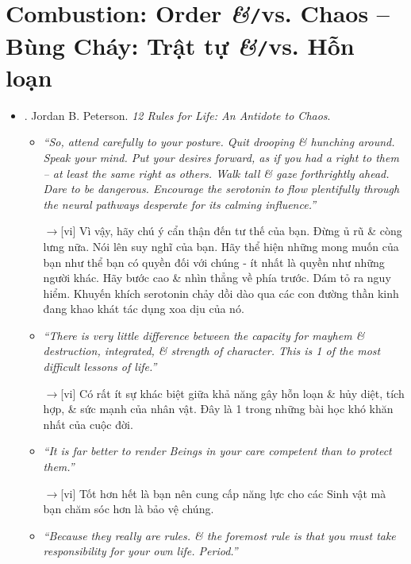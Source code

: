 \documentclass[12pt,oneside]{book}
\begin{document}
\chapter{Combustion: Order {\it\&}{\tt/}vs. Chaos -- Bùng Cháy: Trật tự {\it\&}{\tt/}vs. Hỗn loạn}
\minitoc
{}
\begin{itemize}
	\item \cite{Peterson_rule}. {\sc Jordan B. Peterson}. {\it 12 Rules for Life: An Antidote to Chaos}.
	\begin{itemize}
		\item {\it``So, attend carefully to your posture. Quit drooping \& hunching around. Speak your mind. Put your desires forward, as if you had a right to them -- at least the same right as others. Walk tall \& gaze forthrightly ahead. Dare to be dangerous. Encourage the serotonin to flow plentifully through the neural pathways desperate for its calming influence.''}
		
		{\sf[en]$\to$[vi]} Vì vậy, hãy chú ý cẩn thận đến tư thế của bạn. Đừng ủ rũ \& còng lưng nữa. Nói lên suy nghĩ của bạn. Hãy thể hiện những mong muốn của bạn như thể bạn có quyền đối với chúng - ít nhất là quyền như những người khác. Hãy bước cao \& nhìn thẳng về phía trước. Dám tỏ ra nguy hiểm. Khuyến khích serotonin chảy dồi dào qua các con đường thần kinh đang khao khát tác dụng xoa dịu của nó.
		
		\item {\it``There is very little difference between the capacity for mayhem \& destruction, integrated, \& strength of character. This is 1 of the most difficult lessons of life.''}
		
		{\sf[en]$\to$[vi]} Có rất ít sự khác biệt giữa khả năng gây hỗn loạn \& hủy diệt, tích hợp, \& sức mạnh của nhân vật. Đây là 1 trong những bài học khó khăn nhất của cuộc đời.
		
		\item {\it``It is far better to render Beings in your care competent than to protect them.''}
		
		{\sf[en]$\to$[vi]} Tốt hơn hết là bạn nên cung cấp năng lực cho các Sinh vật mà bạn chăm sóc hơn là bảo vệ chúng.
		
		\item {\it``Because they really are rules. \& the foremost rule is that you must take responsibility for your own life. Period.''}
		

\end{itemize}
\end{itemize}
\end{document}
